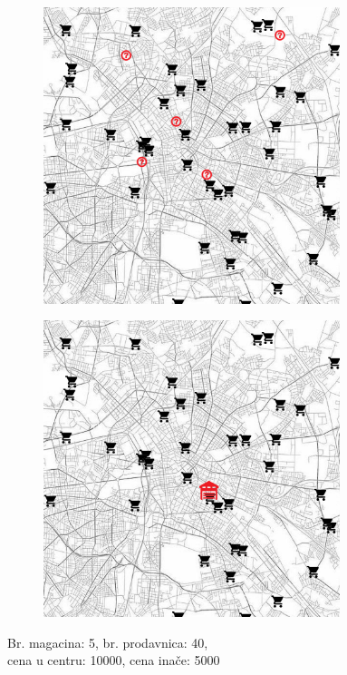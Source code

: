 \documentclass[a4paper]{article}
\begin{document}
\begin{figure}[H]
\centering
\begin{subfigure}{.5\textwidth}
    \centering
    \includegraphics[width=0.95\textwidth]{pics/candidates2.png}
\end{subfigure}%
\begin{subfigure}{.5\textwidth}
    \centering
    \includegraphics[width=0.95\textwidth]{pics/final2.png}
\end{subfigure}
\caption[long]{Br. magacina: 5, br. prodavnica: 40, \\cena u centru: 10000, cena inače: 5000}
\end{figure}
\end{document}

